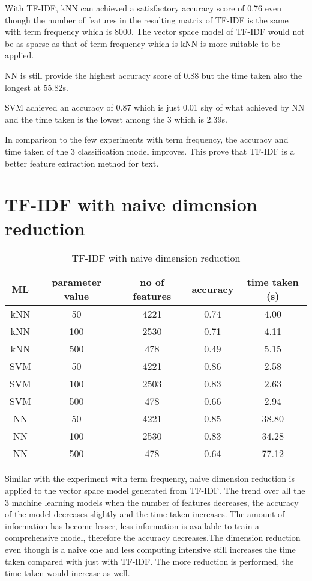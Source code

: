 With TF-IDF, kNN can achieved a satisfactory accuracy score of 0.76 even though the number of features in the resulting matrix of TF-IDF is the same with term frequency which is 8000. The vector space model of TF-IDF would not be as sparse as that of term frequency which is kNN is more suitable to be applied.

NN is still provide the highest accuracy score of 0.88 but the time taken also the longest at 55.82s.

SVM achieved an accuracy of 0.87 which is just 0.01 shy of what achieved by NN and the time taken is the lowest among the 3 which is 2.39s.

In comparison to the few experiments with term frequency, the accuracy and time taken of the 3 classification model improves. This prove that TF-IDF is a better feature extraction method for text.

\clearpage
\section{TF-IDF with naive dimension reduction}

\begin{table} [ht]
	\centering
	\begin{tabular}{|| c | c | c | c | c||}
		\hline
		ML & parameter value & no of features & accuracy & time taken (s) \\ [0.5ex]
		\hline\hline
		kNN & 50 & 4221 & 0.74 & 4.00 \\ 
		\hline
		kNN & 100 & 2530 & 0.71 & 4.11 \\ 
		\hline
		kNN & 500 & 478 & 0.49 & 5.15 \\ 
		\hline\hline
		SVM & 50 & 4221 & 0.86 & 2.58 \\
		\hline
		SVM & 100 & 2503 & 0.83 & 2.63 \\
		\hline
		SVM & 500 & 478 & 0.66 & 2.94 \\
		\hline\hline
		NN & 50 & 4221 & 0.85 & 38.80 \\
		\hline
		NN & 100 & 2530 & 0.83 & 34.28 \\
		\hline
		NN & 500 & 478 & 0.64 & 77.12 \\
		\hline
	\end{tabular}
\caption{TF-IDF with naive dimension reduction}
\label{tbl:tfidfNaive}
\end{table}

Similar with the experiment with term frequency, naive dimension reduction is applied to the vector space model generated from TF-IDF. The trend over all the 3 machine learning models when the number of features decreases, the accuracy of the model decreases slightly and the time taken increases. The amount of information has become lesser, less information is available to train a comprehensive model, therefore the accuracy decreases.The dimension reduction even though is a naive one and less computing intensive still increases the time taken compared with just with TF-IDF. The more reduction is performed, the time taken would increase as well.

